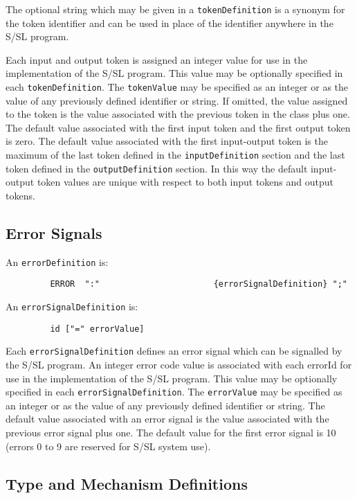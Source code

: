 The optional string which may be given in a {\tt tokenDefinition}
is  a synonym for the token identifier and can be used
in place of the identifier anywhere in the S/SL program.

Each input and output token is assigned an integer  value
for  use  in  the  implementation of the S/SL program.  This
value may be optionally specified in  each  {\tt tokenDefinition}.
The {\tt tokenValue} may  be  specified  as an integer or as the
value of any previously defined identifier  or  string.   If
omitted,  the value assigned to the token is the value associated with 
the previous token in the class plus one. The
default  value associated with the first input token and the
first output token is zero.  The  default  value  associated
with the first input-output token is the maximum of the last
token defined in the {\tt inputDefinition} section  and  the    last
token  defined in the {\tt outputDefinition} section.    In this way
the  default  input-output  token  values  are  unique  with
respect to both input tokens and output tokens.




\subsection{Error Signals}

An {\tt errorDefinition} is:
\begin{verbatim}
         ERROR  ":"                       {errorSignalDefinition} ";"
\end{verbatim}

An {\tt errorSignalDefinition} is:
\begin{verbatim}
         id ["=" errorValue]
\end{verbatim}

Each {\tt errorSignalDefinition} defines an error signal  which
can be signalled by the S/SL program.  An integer error code
value is associated with each errorId for use in the  
implementation of the S/SL program.     This value may be optionally
specified in each {\tt errorSignalDefinition}.  The {\tt errorValue} may
be specified as an integer or as the value of any previously
defined identifier or string.  The default value  associated
with an error signal is the value associated with the 
previous error signal plus one.  The default value for the  first
error signal is 10 (errors 0 to 9 are reserved for S/SL system use).




\subsection{Type and Mechanism Definitions}

